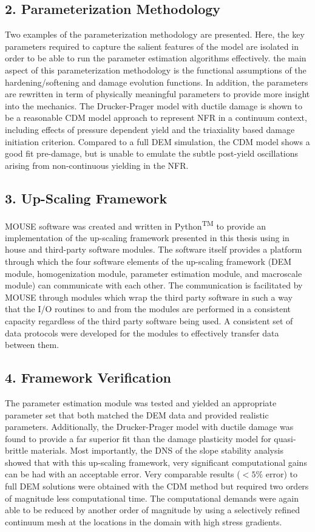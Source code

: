 \subsection*{2. Parameterization Methodology}

Two examples of the parameterization methodology are presented. Here, the key parameters required to capture the salient features of the model are isolated in order to be able to run the parameter estimation algorithms effectively. the main aspect of this parameterization methodology is the functional assumptions of the hardening/softening and damage evolution functions. In addition, the parameters are rewritten in term of physically meaningful parameters to provide more insight into the mechanics. The Drucker-Prager model with ductile damage is shown to be a reasonable CDM model approach to represent NFR in a continuum context, including effects of pressure dependent yield and the triaxiality based damage initiation criterion. Compared to a full DEM simulation, the CDM model shows a good fit pre-damage, but is unable to emulate the subtle post-yield oscillations arising from non-continuous yielding in the NFR.

\subsection*{3. Up-Scaling Framework}

MOUSE software was created and written in Python\textsuperscript{TM} to provide an implementation of the up-scaling framework presented in this thesis using in house and third-party software modules. The software itself provides a platform through which the four software elements of the up-scaling framework (DEM module, homogenization module, parameter estimation module, and macroscale module) can communicate with each other. The communication is facilitated by MOUSE through modules which wrap the third party software in such a way that the I/O routines to and from the modules are performed in a consistent capacity regardless of the third party software being used. A consistent set of data protocols were developed for the modules to effectively transfer data between them.

\subsection*{4. Framework Verification}

The parameter estimation module was tested and yielded an appropriate parameter set that both matched the DEM data and provided realistic parameters. Additionally, the Drucker-Prager model with ductile damage was found to provide a far superior fit than the damage plasticity model for quasi-brittle materials. Most importantly, the DNS of the slope stability analysis showed that with this up-scaling framework, very significant computational gains can be had with an acceptable error. Very comparable results ($<5\%$ error) to full DEM solutions were obtained with the CDM method but required two orders of magnitude less computational time. The computational demands were again able to be reduced by another order of magnitude by using a selectively refined continuum mesh at the locations in the domain with high stress gradients.

